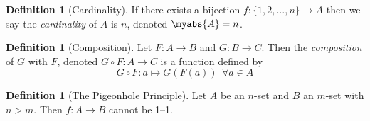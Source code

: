 \documentclass[11pt]{article}
\theoremstyle{definition}
\newtheorem{definition}[theorem]{Definition}
\begin{document}
\begin{definition}[Cardinality]
    If there exists a bijection $f: \{1,2,\dots,n\} \to A$ then we say the
    \emph{cardinality} of $A$ is $n$, denoted $\myabs{A}=n$.
\end{definition}
\begin{definition}[Composition]
    Let $F: A \to B$ and $G: B \to C$. Then the \emph{composition} of $G$
    with $F$, denoted $G \circ F: A \to C$ is a function defined by
    $$ G \circ F: a \mapsto G(F(a)) \ \ \forall a \in A$$
\end{definition}
\begin{definition}[The Pigeonhole Principle]
    Let $A$ be an $n$-set and $B$ an $m$-set with $n > m$. Then $f: A \to
    B$ cannot be 1--1.
\end{definition}
\end{document}
